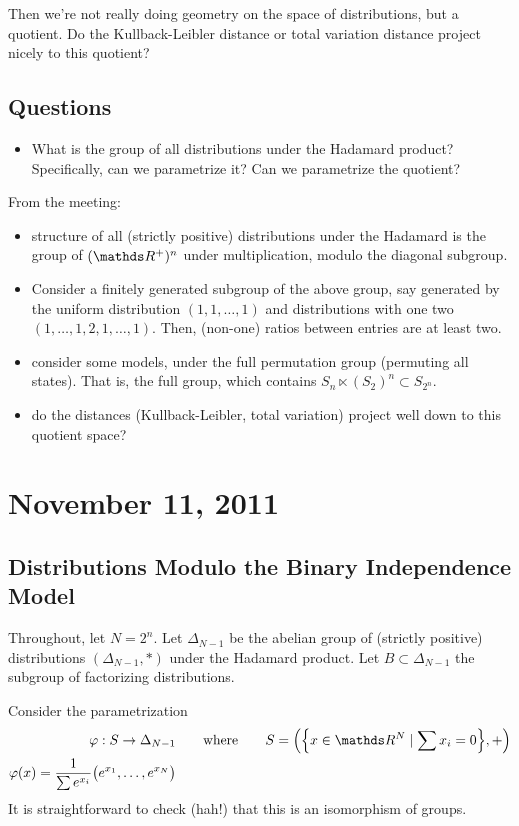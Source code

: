 \documentclass[11pt]{article}
\begin{document}
Then we're not really doing geometry on the space of distributions, but a
quotient.  Do the Kullback-Leibler distance or total variation distance project
nicely to this quotient?

\subsection{Questions}
\begin{itemize}
    \item What is the group of all distributions under the Hadamard product?
    Specifically, can we parametrize it?  Can we parametrize the quotient?
\end{itemize}

From the meeting:

\begin{itemize}
    \item structure of all (strictly positive) distributions under the Hadamard
    is the group of $(\R^+)^n$ under multiplication, modulo the diagonal
    subgroup.
    \item Consider a finitely generated subgroup of the above group, say
    generated by the uniform distribution $(1,1,\ldots, 1)$ and distributions
    with one two $(1,\ldots, 1,2,1, \ldots, 1)$.  Then, (non-one) ratios between
    entries are at least two.
    \item consider some models, under the full permutation group (permuting all
    states).  That is, the full group, which contains $S_n \ltimes (S_2)^n
    \subset S_{2^n}$.
    \item do the distances (Kullback-Leibler, total variation) project well down
    to this quotient space?
\end{itemize}

\section{November 11, 2011}

\subsection{Distributions Modulo the Binary Independence Model}

Throughout, let $N = 2^n$.  Let $\Delta_{N-1}$ be the abelian group of (strictly
positive) distributions $(\Delta_{N-1}, *)$ under the Hadamard product.  Let $B
\subset \Delta_{N-1}$ the subgroup of factorizing distributions.

Consider the parametrization
\begin{align*}
    \varphi : S \to \Delta_{N-1}
    &\qquad\text{where}\qquad
    S = \pdil*{\cdil*{x \in \R^N \mid \sum x_i = 0}, +} \\
    \varphi(x) = \frac{1}{\sum e^{x_i}}\pdil[\big]{e^{x_1}, \ldots, e^{x_N}}
\end{align*}
It is straightforward to check (hah!) that this is an isomorphism of groups.
\end{document}
